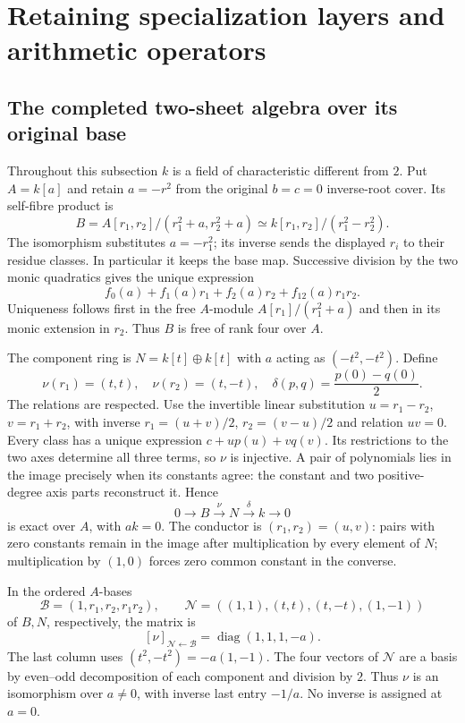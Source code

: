 \section{Retaining specialization layers and arithmetic operators}
\label{sec:specialization}

\subsection{The completed two-sheet algebra over its original base}
Throughout this subsection $k$ is a field of characteristic different from
$2$. Put $A=k[a]$ and retain $a=-r^2$ from the original $b=c=0$
inverse-root cover. Its self-fibre product is
\[
 B=A[r_1,r_2]/(r_1^2+a,r_2^2+a)
   \simeq k[r_1,r_2]/(r_1^2-r_2^2).
\]
The isomorphism substitutes $a=-r_1^2$; its inverse sends the displayed
$r_i$ to their residue classes. In particular it keeps the base map.
Successive division by the two monic quadratics gives the unique expression
\begin{equation}\label{eq:B-basis}
 f_0(a)+f_1(a)r_1+f_2(a)r_2+f_{12}(a)r_1r_2.
\end{equation}
Uniqueness follows first in the free $A$-module
$A[r_1]/(r_1^2+a)$ and then in its monic extension in $r_2$.
Thus $B$ is free of rank four over $A$.

The component ring is $N=k[t]\oplus k[t]$ with $a$ acting as
$(-t^2,-t^2)$. Define
\begin{equation}\label{eq:nu-r}
 \nu(r_1)=(t,t),\quad \nu(r_2)=(t,-t),\quad
 \delta(p,q)=\frac{p(0)-q(0)}2.
\end{equation}
The relations are respected. Use the invertible linear substitution
$u=r_1-r_2$, $v=r_1+r_2$, with inverse
$r_1=(u+v)/2$, $r_2=(v-u)/2$ and relation $uv=0$.
Every class has a unique expression $c+up(u)+vq(v)$.
Its restrictions to the two axes determine all three terms, so $\nu$
is injective. A pair of polynomials lies in the image precisely when
its constants agree: the constant and two positive-degree axis parts
reconstruct it. Hence
\begin{equation}\label{eq:conductor-A-exact}
 0\longrightarrow B\xrightarrow{\nu}N
 \xrightarrow{\delta}k\longrightarrow0
\end{equation}
is exact over $A$, with $ak=0$.
The conductor is $(r_1,r_2)=(u,v)$: pairs with zero constants
remain in the image after multiplication by every element of $N$;
multiplication by $(1,0)$ forces zero common constant in the converse.

In the ordered $A$-bases
\[
 \mathcal B=(1,r_1,r_2,r_1r_2),\qquad
 \mathcal N=((1,1),(t,t),(t,-t),(1,-1))
\]
of $B,N$, respectively, the matrix is
\begin{equation}\label{eq:specialization-matrix}
 [\nu]_{\mathcal N\leftarrow\mathcal B}
     =\operatorname{diag}(1,1,1,-a).
\end{equation}
The last column uses $(t^2,-t^2)=-a(1,-1)$.
The four vectors of $\mathcal N$ are a basis by even--odd decomposition
of each component and division by $2$.
Thus $\nu$ is an isomorphism over $a\ne0$, with inverse last entry
$-1/a$. No inverse is assigned at $a=0$.

